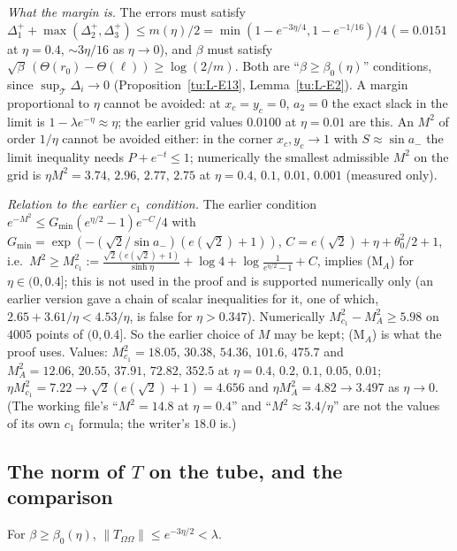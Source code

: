 \noindent\emph{What the margin is.} The errors must satisfy $\Delta_1^++\max(\Delta_2^+,\Delta_3^+)\le m(\eta)/2
=\min(1-e^{-3\eta/4},1-e^{-1/16})/4$ ($=0.0151$ at $\eta=0.4$, $\sim3\eta/16$ as $\eta\to0$), and $\beta$ must satisfy
$\sqrt\beta\,(\Theta(r_0)-\Theta(\ell))\ge\log(2/m)$. Both are ``$\beta\ge\beta_0(\eta)$'' conditions, since $\sup_{\mathcal T}\Delta_i\to0$
(Proposition~\ref{tu:L-E13}, Lemma~\ref{tu:L-E2}). A margin proportional to $\eta$ cannot be avoided: at $x_c=y_c=0$, $a_2=0$ the
exact slack in the limit is $1-\lambda e^{-\eta}\approx\eta$; the earlier grid values $0.0100$ at $\eta=0.01$ are this.
An $M^2$ of order $1/\eta$ cannot be avoided either: in the corner $x_c,y_c\to1$ with $S\approx\sin a_-$ the limit inequality
needs $P+e^{-t}\le1$; numerically the smallest admissible $M^2$ on the grid is $\eta M^2=3.74,\,2.96,\,2.77,\,2.75$ at
$\eta=0.4,\,0.1,\,0.01,\,0.001$ (measured only).

\noindent\emph{Relation to the earlier $c_1$ condition.} The earlier condition $e^{-M^2}\le G_{\min}(e^{\eta/2}-1)e^{-C}/4$ with
$G_{\min}=\exp(-(\sqrt2/\sin a_-)(e(\sqrt2)+1))$, $C=e(\sqrt2)+\eta+\theta_0^2/2+1$, i.e.\
$M^2\ge M_{c_1}^2:=\frac{\sqrt2(e(\sqrt2)+1)}{\sinh\eta}+\log4+\log\frac1{e^{\eta/2}-1}+C$, implies (M$_A$) for $\eta\in(0,0.4]$; this is not used in the proof and is supported numerically only (an earlier
version gave a chain of scalar inequalities for it, one of which, $2.65+3.61/\eta<4.53/\eta$, is false for $\eta>0.347$).
Numerically $M_{c_1}^2-M_A^2\ge5.98$ on $4005$ points
of $(0,0.4]$. So the earlier choice of $M$ may be kept; (M$_A$) is what the proof uses. Values:
$M_{c_1}^2=18.05,\,30.38,\,54.36,\,101.6,\,475.7$ and $M_A^2=12.06,\,20.55,\,37.91,\,72.82,\,352.5$ at
$\eta=0.4,\,0.2,\,0.1,\,0.05,\,0.01$; $\eta M_{c_1}^2=7.22\to\sqrt2(e(\sqrt2)+1)=4.656$ and $\eta M_A^2=4.82\to3.497$ as
$\eta\to0$. (The working file's ``$M^2=14.8$ at $\eta=0.4$'' and ``$M^2\approx3.4/\eta$'' are not the values of its own $c_1$
formula; the writer's $18.0$ is.)

\subsection{The norm of $T$ on the tube, and the comparison}

\begin{lemma}\label{tu:L-norm}
For $\beta\ge\beta_0(\eta)$, $\|T_{\Omega\Omega}\|\le e^{-3\eta/2}<\lambda$.
\end{lemma}

